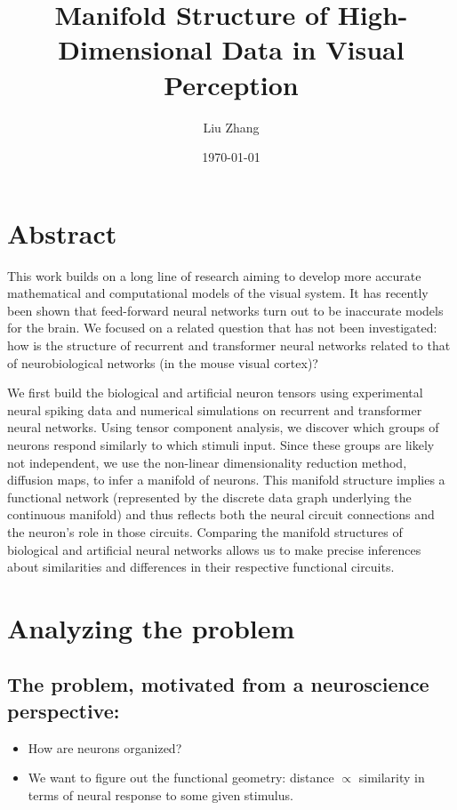 \documentclass{article}
\title{Manifold Structure of High-Dimensional Data in Visual Perception}
\author{Liu Zhang}
\date{\today}
\begin{document}
\maketitle

\section{Abstract}

This work builds on a long line of research aiming to develop more accurate mathematical and computational models of the visual system. It has recently been shown that feed-forward neural networks turn out to be inaccurate models for the brain. We focused on a related question that has not been investigated: how is the structure of recurrent and transformer neural networks related to that of neurobiological networks (in the mouse visual cortex)?

We first build the biological and artificial neuron tensors using experimental neural spiking data and numerical simulations on recurrent and transformer neural networks. Using tensor component analysis, we discover which groups of neurons respond similarly to which stimuli input. Since these groups are likely not independent, we use the non-linear dimensionality reduction method, diffusion maps, to infer a manifold of neurons. This manifold structure implies a functional network (represented by the discrete data graph underlying the continuous manifold) and thus reflects both the neural circuit connections and the neuron’s role in those circuits. Comparing the manifold structures of biological and artificial neural networks allows us to make precise inferences about similarities and differences in their respective functional circuits. 

\section{Analyzing the problem}
\subsection{The problem, motivated from a neuroscience perspective:}
\begin{itemize}
    \item How are neurons organized?
    \item We want to figure out the functional geometry: distance  $\propto$ similarity in terms of neural response to some given stimulus.
\end{itemize}
\end{document}
